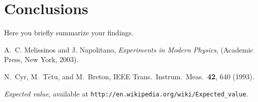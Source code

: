 \documentclass[letterpaper,12pt]{article}
\begin{document}
\section{Conclusions}
Here you briefly summarize your findings.


\begin{thebibliography}{99}

A.~C. Melissinos and J. Napolitano, \textit{Experiments in Modern Physics},
(Academic Press, New York, 2003).

N.\ Cyr, M.\ T$\hat{e}$tu, and M.\ Breton,
IEEE Trans.\ Instrum.\ Meas.\ \textbf{42}, 640 (1993).

 \emph{Expected value},  available at
\texttt{http://en.wikipedia.org/wiki/Expected\_value}.

\end{thebibliography}
\end{document}
